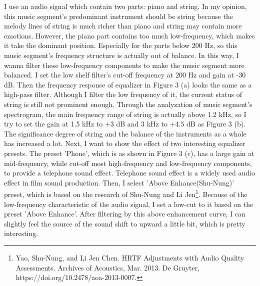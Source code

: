 \documentclass[a4paper]{tufte-handout} %
\begin{document}
I use an audio signal which contain two parts: piano and string. In my opinion, this music segment's predominant instrument should be string because the melody lines of string is much richer than piano and string may contain more emotions. However, the piano part contains too much low-frequency, which makes it take the dominant position. Especially for the parts below 200 Hz, so this music segment's frequency structure is actually out of balance. 
In this way, I wanna filter these low-frequency components to make the music segment more balanced. I set the low shelf filter's cut-off frequency at 200 Hz and gain at -30 dB. Then the frequency response of equalizer in Figure 3 (a) looks the same as a high-pass filter. Although I filter the low frequency of it, the current status of string is still not prominent enough. Through the analyzation of music segment's spectrogram, the main frequency range of string is actually above 1.2 kHz, so I try to set the gain at 1.5 kHz to +3 dB and 3 kHz to +4.5 dB as Figure 3 (b). The significance degree of string and the balance of the instruments as a whole has increased a lot.  
Next, I want to show the effect of two interesting equalizer presets. The preset 'Phone', which is as shown in Figure 3 (c), has a large gain at mid-frequency, while cut-off most high-frequency and low-frequency components, to provide a telephone sound effect. Telephone sound effect is a widely used audio effect in film sound production. Then, I select 'Above Enhance(Shu-Nung)' preset, which is based on the research of Shu-Nung and Li Jen\footnote{Yao, Shu-Nung, and Li Jen Chen. HRTF Adjustments with Audio Quality Assessments. Archives of Acoustics, Mar. 2013. De Gruyter, https://doi.org/10.2478/aoa-2013-0007.}. Because of the low-frequency characteristic of the audio signal, I set a low-cut to it based on the preset 'Above Enhance'. After filtering by this above enhancement curve, I can slightly feel the source of the sound shift to upward a little bit, which is pretty interesting. 
\end{document}
